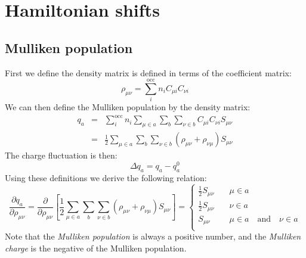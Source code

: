 \documentclass{article}
\numberwithin{equation}{section}
\begin{document}
\section{Hamiltonian shifts}

\subsection{Mulliken population}
\label{sec:mulliken}
First we define the density matrix is defined in terms of the coefficient matrix:
\begin{equation}
    \rho_{\mu\nu} = \sum_i^\mathrm{occ} n_i C_{\mu i} C_{\nu i}
\end{equation}
We can then define the Mulliken population by the density matrix:
\begin{eqnarray}
    q_a 
    &=& \sum_i^\mathrm{occ} n_i \sum_{\mu \in a} \sum_b \sum_{\nu \in b} C_{\mu i} C_{\nu i} S_{\mu\nu}\nonumber\\
    &=& \frac{1}{2} \sum_{\mu \in a} \sum_b \sum_{\nu \in b} \left( \rho_{\mu\nu} + \rho_{\nu\mu}\right) S_{\mu\nu}
\end{eqnarray}
The charge fluctuation is then: 
\begin{equation}
    \Delta q_a = q_a - q_a^0
\end{equation}
Using these definitions we derive the following relation:
\begin{equation}
    \frac{\partial q_a}{\partial \rho_{\mu\nu}}
    = \frac{\partial }{\partial \rho_{\mu\nu}} \left[ \frac{1}{2} \sum_{\mu \in a} \sum_b \sum_{\nu \in b} \left( \rho_{\mu\nu} + \rho_{\nu\mu}\right) S_{\mu\nu} \right]
    = \begin{cases} 
        \frac{1}{2} S_{\mu\nu}& \quad \mu \in a\\
        \frac{1}{2} S_{\mu\nu}& \quad \nu \in a\\
        S_{\mu\nu}& \quad \mu \in a \quad \mathrm{and}\quad \nu \in a\\
    \end{cases}\label{eq:q_rho}
\end{equation}
Note that the \textit{Mulliken population} is always a positive number, and the \textit{Mulliken charge} is the negative of the Mulliken population.
\end{document}
